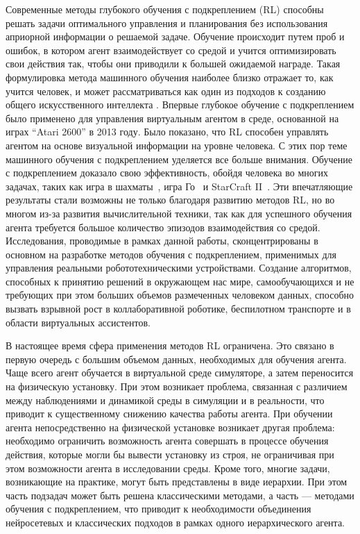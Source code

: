 Современные методы глубокого обучения с подкреплением (RL) способны решать задачи оптимального управления и планирования без использования априорной информации о решаемой задаче. Обучение происходит путем проб и ошибок, в котором агент взаимодействует со средой и учится оптимизировать свои действия так, чтобы они приводили к большей ожидаемой награде. Такая формулировка метода машинного обучения наиболее близко отражает то, как учится человек, и может рассматриваться как один из подходов к созданию общего искусственного интеллекта \cite{reward_is_enough}. Впервые глубокое обучение с подкреплением было применено для управления виртуальным агентом в среде, основанной на играх ``Atari 2600'' в 2013 году\cite{mnih2013atari}. Было показано, что RL способен управлять агентом на основе визуальной информации на уровне человека. С этих пор теме машинного обучения с подкреплением уделяется все больше внимания. Обучение с подкреплением доказало свою эффективность, обойдя человека во многих задачах, таких как игра в шахматы~\cite{alphazero}, игра Го~\cite{alphago} и StarCraft II~\cite{alphastar}. Эти впечатляющие результаты стали возможны не только благодаря развитию методов RL, но во многом из-за развития вычислительной техники, так как для успешного обучения агента требуется большое количество эпизодов взаимодействия со средой. Исследования, проводимые в рамках данной работы, сконцентрированы в основном на разработке методов обучения с подкреплением, применимых для управления реальными робототехническими устройствами. Создание алгоритмов, способных к принятию решений в окружающем нас мире, самообучающихся и не требующих при этом больших объемов размеченных человеком данных, способно вызвать взрывной рост в коллаборативной роботике, беспилотном транспорте и в области виртуальных ассистентов.

В настоящее время сфера применения методов RL ограничена. Это связано в первую очередь с большим объемом данных, необходимых для обучения агента. Чаще всего агент обучается в виртуальной среде симуляторе, а затем переносится на физическую установку. При этом возникает проблема, связанная с различием между наблюдениями и динамикой среды в симуляции и в реальности, что приводит к существенному снижению качества работы агента. При обучении агента непосредственно на физической установке возникает другая проблема: необходимо ограничить возможность агента совершать в процессе обучения действия, которые могли бы вывести установку из строя, не ограничивая при этом возможности агента в исследовании среды. Кроме того, многие задачи, возникающие на практике, могут быть представлены в виде иерархии. При этом часть подзадач может быть решена классическими методами, а часть --- методами обучения с подкреплением, что приводит к необходимости объединения нейросетевых и классических подходов в рамках одного иерархического агента. 


